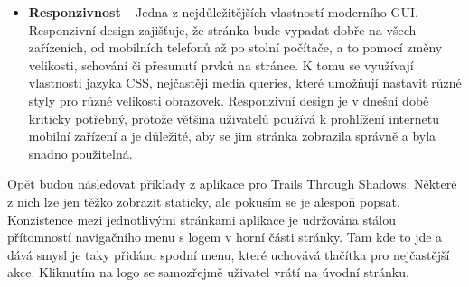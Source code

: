 \begin{itemize}
  \item \textbf{Responzivnost} -- Jedna z nejdůležitějších vlastností moderního GUI. Responzivní design zajišťuje, že stránka bude vypadat dobře na všech zařízeních, od mobilních telefonů až po stolní počítače, a to pomocí změny velikosti, schování či přesunutí prvků na stránce. K tomu se využívají vlastnosti jazyka CSS, nejčastěji media queries, které umožňují nastavit různé styly pro různé velikosti obrazovek. Responzivní design je v dnešní době kriticky potřebný, protože většina uživatelů používá k prohlížení internetu mobilní zařízení a je důležité, aby se jim stránka zobrazila správně a byla snadno použitelná.
\end{itemize}

Opět budou následovat příklady z aplikace pro Trails Through Shadows. Některé z nich lze jen těžko zobrazit staticky, ale pokusím se je alespoň popsat. Konzistence mezi jednotlivými stránkami aplikace je udržována stálou přítomností navigačního menu s logem v horní části stránky. Tam kde to jde a dává smysl je taky přidáno spodní menu, které uchovává tlačítka pro nejčastější akce. Kliknutím na logo se samozřejmě uživatel vrátí na úvodní stránku.

